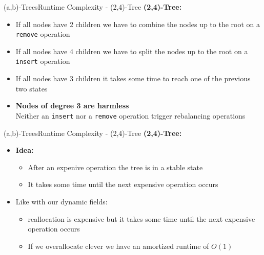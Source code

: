
\begin{frame}{(a,b)-Trees}{Runtime Complexity - (2,4)-Tree}
  \textbf{(2,4)-Tree:}
  \begin{itemize}
    \item<2->
      If all nodes have {\color{Mittel-Blau}2 children} we have to
      {\color{Mittel-Blau}combine} the nodes up to the root on a
      \texttt{\color{Mittel-Blau}remove} operation
    \item<3->
      If all nodes have {\color{Mittel-Blau}4 children} we have to
      {\color{Mittel-Blau}split} the nodes up to the root on a
      \texttt{\color{Mittel-Blau}insert} operation
    \item<4->
      If all nodes have {\color{Mittel-Blau}3 children} it takes some time
      to reach one of the previous two states
    \item<5->[$\Rightarrow$]
      \textbf{Nodes of degree 3 are harmless}\\
      Neither an \texttt{\color{Mittel-Blau}insert} nor a
      \texttt{\color{Mittel-Blau}remove} operation trigger rebalancing
      operations
  \end{itemize}
\end{frame}


\begin{frame}{(a,b)-Trees}{Runtime Complexity - (2,4)-Tree}
  \textbf{(2,4)-Tree:}
  \begin{itemize}
    \item<2->
      \textbf{Idea:}
      \begin{itemize}
        \item<3->
          After an expenive operation the tree is in a stable state
        \item<4->
          It takes some time until the next expensive operation occurs
      \end{itemize}
    \item<5->
      Like with our dynamic fields:
      \begin{itemize}
        \item<6->
          {\color{Mittel-Blau}reallocation} is expensive but it takes some time
          until the next expensive operation occurs
        \item<7->
          If we {\color{Mittel-Blau}overallocate} clever we have an amortized
          runtime of {\color{Mittel-Blau}$O(1)$}
      \end{itemize}
  \end{itemize}
\end{frame}

